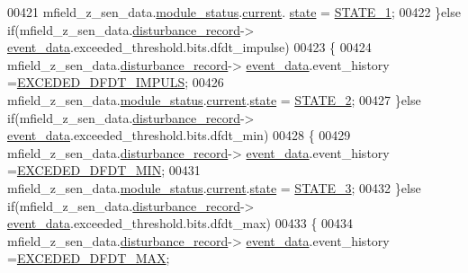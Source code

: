\begin{DoxyCode}
00421                 mfield\_z\_sen\_data.\hyperlink{a00027_adfab5a5d8b45a93dfb13edb24e2b80e3}{module\_status}.\hyperlink{a00019_acf41ffc11da291c2f9f0fcb02ee72b98}{current}.
      \hyperlink{a00019_a6b8d8e916bc56265a3fd279bd26b6d1b}{state} = \hyperlink{a00021_a727351838367f27ac0adb9a13422c342}{STATE\_1};
00422              \}\textcolor{keywordflow}{else} \textcolor{keywordflow}{if}(mfield\_z\_sen\_data.\hyperlink{a00027_ac9b38e2c1d3f1013a88d33506c754152}{disturbance\_record}->
      \hyperlink{a00028_a8c0bda69e71ef674e60da47ad0be9ab0}{event\_data}.exceeded\_threshold.bits.dfdt\_impulse)
00423              \{
00424                  mfield\_z\_sen\_data.\hyperlink{a00027_ac9b38e2c1d3f1013a88d33506c754152}{disturbance\_record}->
      \hyperlink{a00028_a8c0bda69e71ef674e60da47ad0be9ab0}{event\_data}.event\_history =\hyperlink{a00019_abf943c473e214930a7be647c4c43b55d}{EXCEDED\_DFDT\_IMPULS};
00426                mfield\_z\_sen\_data.\hyperlink{a00027_adfab5a5d8b45a93dfb13edb24e2b80e3}{module\_status}.\hyperlink{a00019_acf41ffc11da291c2f9f0fcb02ee72b98}{current}.\hyperlink{a00019_a6b8d8e916bc56265a3fd279bd26b6d1b}{state} = 
      \hyperlink{a00021_a66fa48e832a64af4d405511cecc4c752}{STATE\_2};
00427              \}\textcolor{keywordflow}{else} \textcolor{keywordflow}{if}(mfield\_z\_sen\_data.\hyperlink{a00027_ac9b38e2c1d3f1013a88d33506c754152}{disturbance\_record}->
      \hyperlink{a00028_a8c0bda69e71ef674e60da47ad0be9ab0}{event\_data}.exceeded\_threshold.bits.dfdt\_min)
00428              \{
00429                  mfield\_z\_sen\_data.\hyperlink{a00027_ac9b38e2c1d3f1013a88d33506c754152}{disturbance\_record}->
      \hyperlink{a00028_a8c0bda69e71ef674e60da47ad0be9ab0}{event\_data}.event\_history =\hyperlink{a00019_a7bccfba89f8c2aedefd2d67e2a1c475e}{EXCEDED\_DFDT\_MIN};
00431                mfield\_z\_sen\_data.\hyperlink{a00027_adfab5a5d8b45a93dfb13edb24e2b80e3}{module\_status}.\hyperlink{a00019_acf41ffc11da291c2f9f0fcb02ee72b98}{current}.\hyperlink{a00019_a6b8d8e916bc56265a3fd279bd26b6d1b}{state} = 
      \hyperlink{a00021_ad87f1bc8466a25d9f7da68717d324a22}{STATE\_3};
00432              \}\textcolor{keywordflow}{else} \textcolor{keywordflow}{if}(mfield\_z\_sen\_data.\hyperlink{a00027_ac9b38e2c1d3f1013a88d33506c754152}{disturbance\_record}->
      \hyperlink{a00028_a8c0bda69e71ef674e60da47ad0be9ab0}{event\_data}.exceeded\_threshold.bits.dfdt\_max)
00433              \{
00434                mfield\_z\_sen\_data.\hyperlink{a00027_ac9b38e2c1d3f1013a88d33506c754152}{disturbance\_record}->
      \hyperlink{a00028_a8c0bda69e71ef674e60da47ad0be9ab0}{event\_data}.event\_history =\hyperlink{a00019_afe7d875f6e5291e2b91df5c18af8789f}{EXCEDED\_DFDT\_MAX};

\end{DoxyCode}
